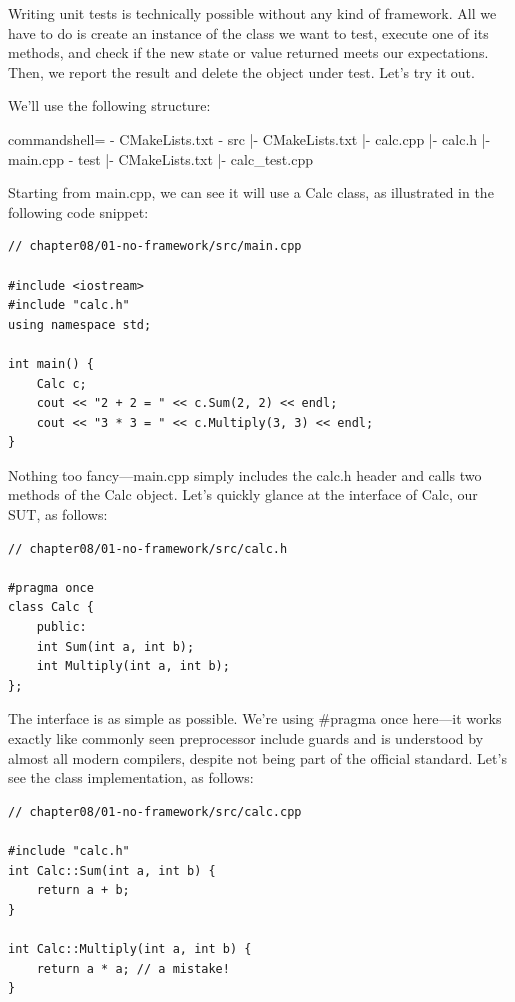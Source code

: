 
Writing unit tests is technically possible without any kind of framework. All we have to do is create an instance of the class we want to test, execute one of its methods, and check if the new state or value returned meets our expectations. Then, we report the result and delete the object under test. Let's try it out.

We'll use the following structure:

\begin{tcblisting}{commandshell={}}
- CMakeLists.txt
- src
     |- CMakeLists.txt
     |- calc.cpp
     |- calc.h
     |- main.cpp
- test
     |- CMakeLists.txt
     |- calc_test.cpp
\end{tcblisting}

Starting from main.cpp, we can see it will use a Calc class, as illustrated in the following code snippet:

\begin{lstlisting}[style=styleCXX]
// chapter08/01-no-framework/src/main.cpp

#include <iostream>
#include "calc.h"
using namespace std;

int main() {
	Calc c;
	cout << "2 + 2 = " << c.Sum(2, 2) << endl;
	cout << "3 * 3 = " << c.Multiply(3, 3) << endl;
}
\end{lstlisting} 

Nothing too fancy—main.cpp simply includes the calc.h header and calls two methods of the Calc object. Let's quickly glance at the interface of Calc, our SUT, as follows:

\begin{lstlisting}[style=styleCXX]
// chapter08/01-no-framework/src/calc.h

#pragma once
class Calc {
	public:
	int Sum(int a, int b);
	int Multiply(int a, int b);
};
\end{lstlisting} 

The interface is as simple as possible. We're using \#pragma once here—it works exactly like commonly seen preprocessor include guards and is understood by almost all modern compilers, despite not being part of the official standard. Let's see the class implementation, as follows:

\begin{lstlisting}[style=styleCXX]
// chapter08/01-no-framework/src/calc.cpp

#include "calc.h"
int Calc::Sum(int a, int b) {
	return a + b;
}

int Calc::Multiply(int a, int b) {
	return a * a; // a mistake!
}
\end{lstlisting} 


